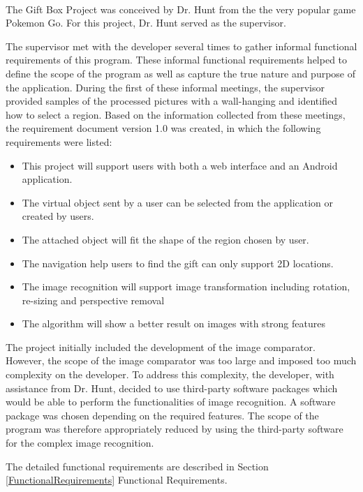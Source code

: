 \paragraph{}
The Gift Box Project was conceived by Dr. Hunt from the the very popular game Pokemon Go. For this project, Dr. Hunt served as the supervisor.
\par The supervisor met with the developer several times to gather informal functional requirements of this program. These informal functional requirements helped to define the scope of the program as well as capture the true nature and purpose of the application. During the first of these informal meetings, the supervisor provided samples of the processed pictures with a wall-hanging and identified how to select a region. Based on the information collected from these meetings, the requirement document version 1.0 was created, in which the following requirements were listed:
\begin{itemize}
\item This project will support users with both a web interface and an Android application.
\item The virtual object sent by a user can be selected from the application or created by users. 
\item The attached object will fit the shape of the region chosen by user.
\item The navigation help users to find the gift can only support 2D locations. 
\item The image recognition will support image transformation including rotation, re-sizing and perspective removal
\item The algorithm will show a better result on images with strong features
\end{itemize}
\par The project initially included the development of the image comparator. However, the scope of the image comparator was too large and imposed too much complexity on the developer. To address this complexity, the developer, with assistance from Dr. Hunt, decided to use third-party software packages which would be able to perform the functionalities of image recognition. A software package was chosen depending on the required features. The scope of the program was therefore appropriately reduced by using the third-party software for the complex image recognition.
\par The detailed functional requirements are described in Section \ref{FunctionalRequirements} Functional Requirements. 

